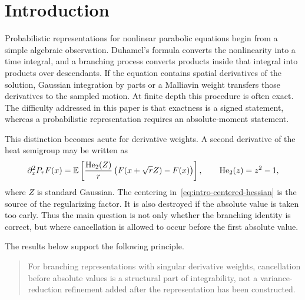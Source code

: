 \section{Introduction}
\label{sec:introduction}

Probabilistic representations for nonlinear parabolic equations begin from a simple algebraic observation. Duhamel's formula converts the nonlinearity into a time integral, and a branching process converts products inside that integral into products over descendants. If the equation contains spatial derivatives of the solution, Gaussian integration by parts or a Malliavin weight transfers those derivatives to the sampled motion. At finite depth this procedure is often exact. The difficulty addressed in this paper is that exactness is a signed statement, whereas a probabilistic representation requires an absolute-moment statement.

This distinction becomes acute for derivative weights. A second derivative of the heat semigroup may be written as
\begin{equation}
  \partial_x^2P_rF(x)
  =
  \mathbb E\left[
    \frac{\operatorname{He}_2(Z)}{r}
    \left(F(x+\sqrt r Z)-F(x)\right)
  \right],
  \qquad
  \operatorname{He}_2(z)=z^2-1,
  \label{eq:intro-centered-hessian}
\end{equation}
where $Z$ is standard Gaussian. The centering in~\eqref{eq:intro-centered-hessian} is the source of the regularizing factor. It is also destroyed if the absolute value is taken too early. Thus the main question is not only whether the branching identity is correct, but where cancellation is allowed to occur before the first absolute value.

The results below support the following principle.

\begin{quote}
For branching representations with singular derivative weights, cancellation before absolute values is a structural part of integrability, not a variance-reduction refinement added after the representation has been constructed.
\end{quote}

